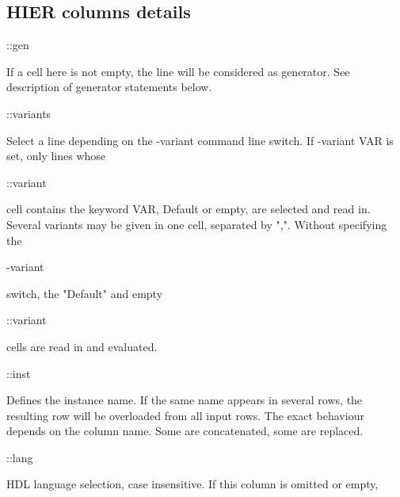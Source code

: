 \documentclass[a4paper,12pt]{article}
\begin{document}
\subsection{HIER columns details}
\begin{bf}::gen\end{bf}\hspace*{12mm}If a cell here is not empty, the line will be considered as\newline\hspace*{18mm} generator. See description of generator statements below.\newline
\begin{bf}::variants\end{bf}\hspace*{6mm}Select a line depending on the -variant command line switch. If
\newline\hspace*{18mm}-variant VAR is set, only lines whose \begin{tt}::variant\end{tt} cell contains the keyword
\newline\hspace*{18mm}VAR, Default or empty, are selected and read in. Several variants may be
\newline\hspace*{18mm}given in one cell, separated by ",". Without specifying the \begin{tt}-variant\end{tt} switch,
\newline\hspace*{18mm}the "Default" and empty \begin{tt}::variant\end{tt} cells are read in and evaluated.\newline
\begin{bf}::inst\end{bf}\hspace*{10mm}Defines the instance name. If the same name appears in several rows, the
\newline\hspace*{18mm}resulting row will be overloaded from all input rows. The exact behaviour
\newline\hspace*{18mm}depends on the column name. Some are concatenated, some are replaced.\newline
\begin{bf}::lang\end{bf}\hspace*{9mm}HDL language selection, case insensitive. If this column is omitted or empty,
\end{document}
